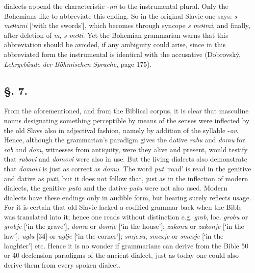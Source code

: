 dialects append the characteristic -\textit{mi} to the instrumental plural. Only the Bohemians like to abbreviate this ending. So in the original Slavic one says: \textit{s meчami} [‘with the swords’], which becomes through syncope \textit{s meчmi}, and finally, after deletion of \textit{m}, \textit{s meчi}. Yet the Bohemian grammarian warns that this abbreviation should be avoided, if any ambiguity could arise, since in this abbreviated form the instrumental is identical with the accusative (Dobrovský, \textit{Lehrgebäude der Böhmischen Sprache}, page 175).

\subsection*{\hspace*{\fill}§. 7.\hspace*{\fill}}

From the aforementioned, and from the Biblical corpus, it is clear that masculine nouns designating something perceptible by means of the senses were inflected by the old Slavs also in adjectival fashion, namely by addition of the syllable -\textit{ov}. Hence, although the grammarian’s paradigm gives the dative \textit{rabu} and \textit{domu} for \textit{rab} and \textit{dom}, witnesses from antiquity, were they alive and present, would testify that \textit{rabovi} and \textit{domovi} were also in use. But the living dialects also demonstrate that \textit{domovi} is just as correct as \textit{domu}. The word \textit{put} ‘road’ is read in the genitive and dative as \textit{puti}, but it does not follow that, just as in the inflection of modern dialects, the genitive \textit{puta} and the dative \textit{putu} were not also used. Modern dialects have these endings only in audible form, but hearing surely reflects usage. For it is certain that old Slavic lacked a codified grammar back when the Bible was translated into it; hence one reads without distinction e.g. \textit{grob}, loc. \textit{grobu} or \textit{grobje}  [‘in the grave’], \textit{domu} or \textit{domje}  [‘in the house’]; \textit{zakonu} or \textit{zakonje}  [‘in the law’]; \textit{uglu} [34] or \textit{uglje}  [‘in the corner’]; \textit{smjexu}, \textit{smexje} or \textit{smesje} [‘in the laughter’] etc. Hence it is no wonder if grammarians can derive from the Bible 50 or 40 declension paradigms of the ancient dialect, just as today one could also derive them from every spoken dialect.

